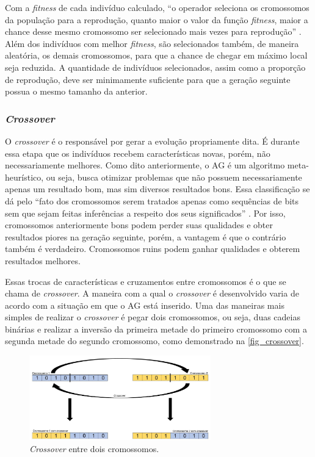 Com a \textit{fitness} de cada indivíduo calculado, “o
operador seleciona os cromossomos da população para a
reprodução, quanto maior o valor da função \textit{fitness}, maior a
chance desse mesmo cromossomo ser selecionado mais vezes para
reprodução” \cite{mitchell1998introduction}.  Além dos
indivíduos com melhor \textit{fitness}, são selecionados também, de
maneira aleatória, os demais cromossomos, para que a chance de
chegar em máximo local seja reduzida. A quantidade de
indivíduos selecionados, assim como a proporção de reprodução,
deve ser minimamente suficiente para que a geração seguinte
possua o mesmo tamanho da anterior.

\subsubsection{\textit{Crossover}}

O \textit{crossover} é o responsável por gerar a evolução propriamente
dita. É durante essa etapa que os indivíduos recebem
características novas, porém, não necessariamente melhores.
Como dito anteriormente, o AG é um algoritmo meta-heurístico,
ou seja, busca otimizar problemas que não possuem
necessariamente apenas um resultado bom, mas sim diversos
resultados bons. Essa classificação se dá pelo “fato dos
cromossomos serem tratados apenas como sequências de bits sem
que sejam feitas inferências a respeito dos seus significados”
\cite{paulino2018}. Por isso, cromossomos anteriormente bons
podem perder suas qualidades e obter resultados piores na
geração seguinte, porém, a vantagem é que o contrário também é
verdadeiro. Cromossomos ruins podem ganhar qualidades e
obterem resultados melhores.

Essas trocas de características e cruzamentos entre
cromossomos é o que se chama de \textit{crossover}. A maneira com a qual o
\textit{crossover} é desenvolvido varia de acordo com a
situação em que o AG está inserido. Uma das maneiras mais
simples de realizar o \textit{crossover} é pegar dois cromossomos, ou
seja, duas cadeias binárias e realizar a inversão da primeira
metade do primeiro cromossomo com a segunda metade do segundo
cromossomo, como demonstrado na \autoref{fig_crossover}.

\begin{figure}[htb]
        \centering
        \caption{\label{fig_crossover}\textit{Crossover} entre dois cromossomos.}
        \includegraphics[width=0.7\textwidth]{images/crossover.jpg}
\end{figure}

